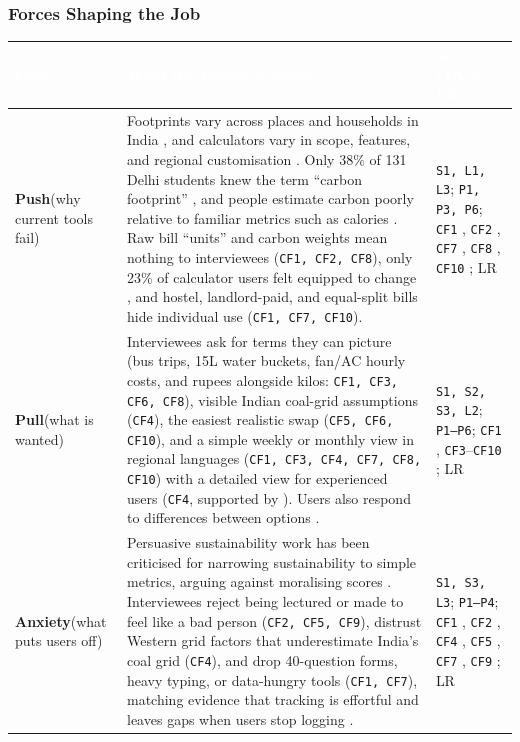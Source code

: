 \documentclass[12pt, a4paper]{article}
\begin{document}
\subsubsection{Forces Shaping the Job}
{\footnotesize
{}
\begin{longtable}{|>{\raggedright\arraybackslash}p{2.5cm}|>{\raggedright\arraybackslash}p{9.2cm}|>{\raggedright\arraybackslash}p{4.3cm}|}
\hline
\rowcolor{cNavy}
\textcolor{white}{\textbf{Force}} & \textcolor{white}{\textbf{What the Evidence Shows}} & \textcolor{white}{\textbf{Source (TA \& LR)}} \\
\hline
\textbf{Push}\newline (why current tools fail) & Footprints vary across places and households in India \cite{lee2021}, and calculators vary in scope, features, and regional customisation \cite{mulrow2019}. Only 38\% of 131 Delhi students knew the term ``carbon footprint'' \cite{gandhi2025}, and people estimate carbon poorly relative to familiar metrics such as calories \cite{grinstein2018}. Raw bill ``units'' and carbon weights mean nothing to interviewees (\texttt{CF1, CF2, CF8}), only 23\% of calculator users felt equipped to change \cite{collins2020}, and hostel, landlord-paid, and equal-split bills hide individual use (\texttt{CF1, CF7, CF10}). & \texttt{S1, L1, L3}; \texttt{P1, P3, P6}; \texttt{CF1} \cite{cf1}, \texttt{CF2} \cite{cf2}, \texttt{CF7} \cite{cf7}, \texttt{CF8} \cite{cf8}, \texttt{CF10} \cite{cf10}; LR \cite{lee2021,gandhi2025,grinstein2018,mulrow2019,collins2020} \\
\hline
\textbf{Pull}\newline (what is wanted) & Interviewees ask for terms they can picture (bus trips, 15L water buckets, fan/AC hourly costs, and rupees alongside kilos: \texttt{CF1, CF3, CF6, CF8}), visible Indian coal-grid assumptions (\texttt{CF4}), the easiest realistic swap (\texttt{CF5, CF6, CF10}), and a simple weekly or monthly view in regional languages (\texttt{CF1, CF3, CF4, CF7, CF8, CF10}) with a detailed view for experienced users (\texttt{CF4}, supported by \cite{hoffmann2024}). Users also respond to differences between options \cite{mohanty2023}. & \texttt{S1, S2, S3, L2}; \texttt{P1--P6}; \texttt{CF1} \cite{cf1}, \texttt{CF3}--\texttt{CF10} \cite{cf3,cf4,cf5,cf6,cf7,cf8,cf9,cf10}; LR \cite{hoffmann2024,mohanty2023} \\
\hline
\textbf{Anxiety}\newline (what puts users off) & Persuasive sustainability work has been criticised for narrowing sustainability to simple metrics, arguing against moralising scores \cite{brynjarsdottir2012}. Interviewees reject being lectured or made to feel like a bad person (\texttt{CF2, CF5, CF9}), distrust Western grid factors that underestimate India's coal grid (\texttt{CF4}), and drop 40-question forms, heavy typing, or data-hungry tools (\texttt{CF1, CF7}), matching evidence that tracking is effortful and leaves gaps when users stop logging \cite{hoffmann2024}. & \texttt{S1, S3, L3}; \texttt{P1--P4}; \texttt{CF1} \cite{cf1}, \texttt{CF2} \cite{cf2}, \texttt{CF4} \cite{cf4}, \texttt{CF5} \cite{cf5}, \texttt{CF7} \cite{cf7}, \texttt{CF9} \cite{cf9}; LR \cite{hoffmann2024,brynjarsdottir2012} \\

\end{longtable}}
\end{document}
